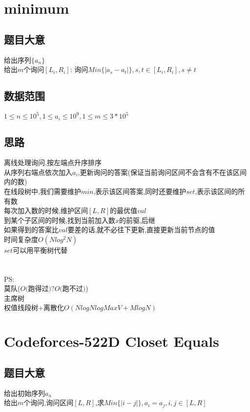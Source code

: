 \documentclass{ctexart}
\numberwithin{equation}{section}
\begin{document}
\begin{flushleft}
  \section{minimum}
  \subsection{题目大意}
  给出序列$\{a_n\}$ \\
  给出$m$个询问$[L_i,R_i]$: 询问$Min\{|a_s-a_t|\},s,t\in [L_i,R_i],s \not = t$ \\ 

  \subsection{数据范围}
  $1\le n\le 10^5,1\le a_i \le 10^9,1\le m \le 3*10^5$ \\
  \subsection{思路}
  离线处理询问,按左端点升序排序 \\
  从序列右端点依次加入$a_i$,更新询问的答案(保证当前询问区间不会含有不在该区间内的数) \\
  在线段树中,我们需要维护$min$,表示该区间答案,同时还要维护$set$,表示该区间的所有数 \\
  每次加入数的时候,维护区间$[L,R]$的最优值$val$ \\
  到某个子区间的时候,找到当前加入数$x$的前驱,后继\\
  如果得到的答案比$val$要差的话,就不必往下更新,直接更新当前节点的值 \\
  时间复杂度$O(Nlog^2N)$ \\

  $set$可以用平衡树代替 \\

  ~\\
  ~\\

  PS: \\
  莫队($O($跑得过$)?O($跑不过$)$)\\
  主席树\\
  权值线段树+离散化$O(NlogNlogMaxV+MlogN)$ \\
  \newpage

  \section{Codeforces-522D Closet Equals}
  \subsection{题目大意}
  给出初始序列${a_n}$ \\
  给出$m$个询问,询问区间$[L,R]$,求$Min\{|i-j|\},a_i=a_j,i,j\in [L,R]$ \\

\end{flushleft}
\end{document}
